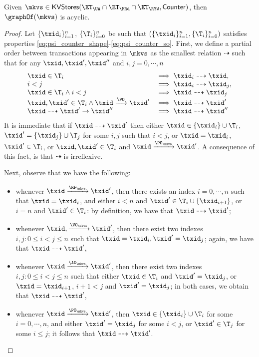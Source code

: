 \begin{corollary}
\label{cor:psi_counter_acyclic}
Given $\mkvs \in \mathsf{KVStores}(\ET_{\UA} \cap \ET_{\MRd} \cap \ET_{\RYW}, \mathsf{Counter})$, 
then $\graphOf(\mkvs)$ is acyclic.
\end{corollary}

\begin{proof}
Let $\{\txid_{i}\}_{i=1}^{n}$, $\{\T_{i}\}_{i=0}^{n}$ 
be such that $(\{\txid_{i}\}_{i=1}^{n}, \{\T_{i}\}_{i=0}^{n})$ 
satisfies properties \eqref{eq:psi_counter_shape}-\eqref{eq:psi_counter_so}. 
First, we define a partial order between transactions appearing in $\mkvs$ 
as the smallest relation $\dashrightarrow$ such that for any $\txid, \txid', \txid''$ and 
$i,j = 0,\cdots, n$
\[
\begin{array}{ll}
\txid \in \T_{i} &\implies \txid_{i} \dashrightarrow \txid,\\
i < j &\implies \txid_{i} \dashrightarrow \txid_{j},\\
\txid \in \T_{i} \wedge i < j & \implies \txid \dashrightarrow \txid_{j}\\
\txid, \txid' \in \T_{i} \wedge \txid \xrightarrow{\PO} \txid' &\implies \txid \dashrightarrow \txid'\\
\txid \dashrightarrow \txid' \rightarrow \txid'' &\implies \txid \dashrightarrow \txid''
\end{array}
\]
It is immediate that if $\txid \dashrightarrow \txid'$ then either $\txid \in \{\txid_{i}\} \cup \T_i$, 
$\txid' = \{\txid_{j}\} \cup \T_{j}$ for some $i,j$ such that $i < j$, or $\txid = \txid_{i}$, $\txid' \in \T_i$, 
or $\txid, \txid' \in \T_{i}$ and $\txid \xrightarrow{\PO_{\mkvs}} \txid'$. A consequence of this fact, 
is that $\dashrightarrow$ is irreflexive.

Next, observe that we have the following: 
\begin{itemize}
\item whenever $\txid \xrightarrow{\RF_{\mkvs}} \txid'$, then 
there exists an index $i = 0,\cdots, n$ such that $\txid = \txid_{i}$, 
and either $i < n$ and $\txid' \in \T_{i} \cup \{ \txid_{i+1} \}$, 
or $i = n$ and $\txid' \in \T_{i}$: by definition, we have that $\txid \dashrightarrow \txid'$;
\item whenever $\txid, \xrightarrow{\VO_{\mkvs}} \txid'$, 
then there exist two indexes $i, j: 0 \leq i < j \leq n$ such that 
$\txid = \txid_{i}, \txid' = \txid_{j}$; again, we have that $\txid \dashrightarrow \txid'$, 
\item whenever $\txid \xrightarrow{\AD_{\mkvs}} \txid'$, then 
there exist two indexes $i, j: 0 \leq i < j \leq n$ such that either 
$\txid \in \T_{i}$ and $\txid' = \txid_{j}$, or $\txid = \txid_{i+1}$, 
$i+1 < j$ and $\txid' = \txid_{j}$; in both cases, we obtain that $\txid \dashrightarrow \txid'$,
\item whenever $\txid \xrightarrow{\PO_{\mkvs}} \txid'$, then 
$\txid \in \{\txid_{i}\} \cup \T_{i}$ for some $i=0,\cdots,n$, 
and either $\txid' = \txid_{j}$ for some $i < j$,  or $\txid' \in \T_{j}$ for 
some $i \leq j$; it follows that $\txid \dashrightarrow \txid'$.
\end{itemize}


\end{proof}
